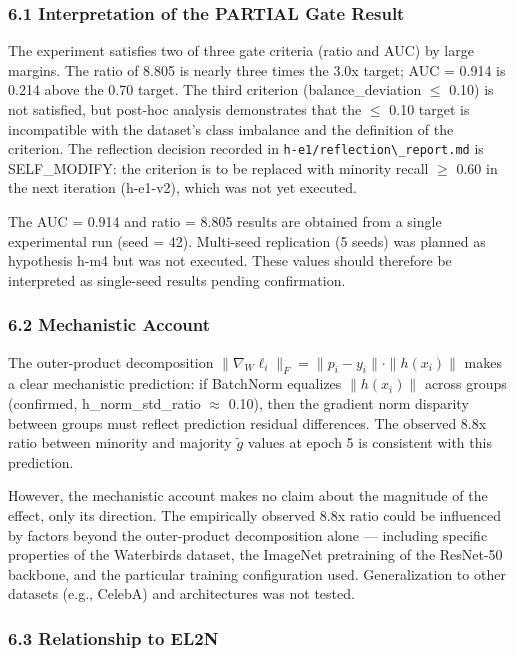 
\subsubsection{6.1 Interpretation of the PARTIAL Gate Result}

The experiment satisfies two of three gate criteria (ratio and AUC) by large margins. The ratio of 8.805 is nearly three times the 3.0x target; AUC = 0.914 is 0.214 above the 0.70 target. The third criterion (balance\_deviation $\leq$ 0.10) is not satisfied, but post-hoc analysis demonstrates that the $\leq$ 0.10 target is incompatible with the dataset's class imbalance and the definition of the criterion. The reflection decision recorded in \texttt{h-e1/reflection\textbackslash \_report.md} is SELF\_MODIFY: the criterion is to be replaced with minority recall $\geq$ 0.60 in the next iteration (h-e1-v2), which was not yet executed.

The AUC = 0.914 and ratio = 8.805 results are obtained from a single experimental run (seed = 42). Multi-seed replication (5 seeds) was planned as hypothesis h-m4 but was not executed. These values should therefore be interpreted as single-seed results pending confirmation.

\subsubsection{6.2 Mechanistic Account}

The outer-product decomposition $\|\nabla _W \ell _{i}\|_F = \|p_i - y_{i}\| \cdot \|h(x_{i})\|$ makes a clear mechanistic prediction: if BatchNorm equalizes $\|h(x_{i})\|$ across groups (confirmed, h\_norm\_std\_ratio $\approx$ 0.10), then the gradient norm disparity between groups must reflect prediction residual differences. The observed 8.8x ratio between minority and majority $\tilde{g}$ values at epoch 5 is consistent with this prediction.

However, the mechanistic account makes no claim about the magnitude of the effect, only its direction. The empirically observed 8.8x ratio could be influenced by factors beyond the outer-product decomposition alone --- including specific properties of the Waterbirds dataset, the ImageNet pretraining of the ResNet-50 backbone, and the particular training configuration used. Generalization to other datasets (e.g., CelebA) and architectures was not tested.

\subsubsection{6.3 Relationship to EL2N}

